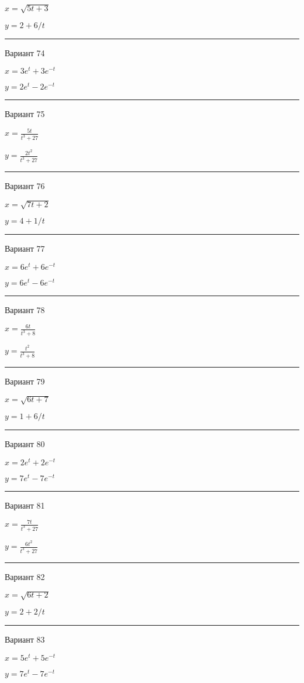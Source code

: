 \documentclass[11pt]{report}
\begin{document}
$x = \sqrt{5 t + 3}$

$y = 2 + 6 / t$

\rule{\textwidth}{.2mm}

 Вариант 74

$x = 3 e^{t} + 3 e^{- t}$

$y = 2 e^{t} - 2 e^{- t}$

\rule{\textwidth}{.2mm}

 Вариант 75

$x = \frac{5 t}{t^{3} + 27}$

$y = \frac{2 t^{2}}{t^{3} + 27}$

\rule{\textwidth}{.2mm}

 Вариант 76

$x = \sqrt{7 t + 2}$

$y = 4 + 1 / t$

\rule{\textwidth}{.2mm}

 Вариант 77

$x = 6 e^{t} + 6 e^{- t}$

$y = 6 e^{t} - 6 e^{- t}$

\rule{\textwidth}{.2mm}

 Вариант 78

$x = \frac{6 t}{t^{3} + 8}$

$y = \frac{t^{2}}{t^{3} + 8}$

\rule{\textwidth}{.2mm}

 Вариант 79

$x = \sqrt{6 t + 7}$

$y = 1 + 6 / t$

\rule{\textwidth}{.2mm}

 Вариант 80

$x = 2 e^{t} + 2 e^{- t}$

$y = 7 e^{t} - 7 e^{- t}$

\rule{\textwidth}{.2mm}

 Вариант 81

$x = \frac{7 t}{t^{3} + 27}$

$y = \frac{6 t^{2}}{t^{3} + 27}$

\rule{\textwidth}{.2mm}

 Вариант 82

$x = \sqrt{6 t + 2}$

$y = 2 + 2 / t$

\rule{\textwidth}{.2mm}

 Вариант 83

$x = 5 e^{t} + 5 e^{- t}$

$y = 7 e^{t} - 7 e^{- t}$
\end{document}
